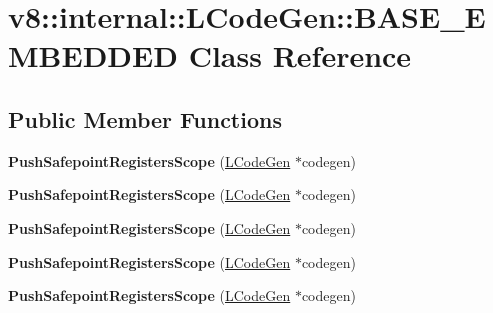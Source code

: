 \hypertarget{classv8_1_1internal_1_1_l_code_gen_1_1_b_a_s_e___e_m_b_e_d_d_e_d}{}\section{v8\+:\+:internal\+:\+:L\+Code\+Gen\+:\+:B\+A\+S\+E\+\_\+\+E\+M\+B\+E\+D\+D\+ED Class Reference}
\label{classv8_1_1internal_1_1_l_code_gen_1_1_b_a_s_e___e_m_b_e_d_d_e_d}
\subsection*{Public Member Functions}
\begin{DoxyCompactItemize}
\item 
{\bfseries Push\+Safepoint\+Registers\+Scope} (\hyperlink{classv8_1_1internal_1_1_l_code_gen}{L\+Code\+Gen} $\ast$codegen)\hypertarget{classv8_1_1internal_1_1_l_code_gen_1_1_b_a_s_e___e_m_b_e_d_d_e_d_a6f1c40f7e330b9eccecbd2c2fe37ddb1}{}\label{classv8_1_1internal_1_1_l_code_gen_1_1_b_a_s_e___e_m_b_e_d_d_e_d_a6f1c40f7e330b9eccecbd2c2fe37ddb1}

\item 
{\bfseries Push\+Safepoint\+Registers\+Scope} (\hyperlink{classv8_1_1internal_1_1_l_code_gen}{L\+Code\+Gen} $\ast$codegen)\hypertarget{classv8_1_1internal_1_1_l_code_gen_1_1_b_a_s_e___e_m_b_e_d_d_e_d_a6f1c40f7e330b9eccecbd2c2fe37ddb1}{}\label{classv8_1_1internal_1_1_l_code_gen_1_1_b_a_s_e___e_m_b_e_d_d_e_d_a6f1c40f7e330b9eccecbd2c2fe37ddb1}

\item 
{\bfseries Push\+Safepoint\+Registers\+Scope} (\hyperlink{classv8_1_1internal_1_1_l_code_gen}{L\+Code\+Gen} $\ast$codegen)\hypertarget{classv8_1_1internal_1_1_l_code_gen_1_1_b_a_s_e___e_m_b_e_d_d_e_d_a6f1c40f7e330b9eccecbd2c2fe37ddb1}{}\label{classv8_1_1internal_1_1_l_code_gen_1_1_b_a_s_e___e_m_b_e_d_d_e_d_a6f1c40f7e330b9eccecbd2c2fe37ddb1}

\item 
{\bfseries Push\+Safepoint\+Registers\+Scope} (\hyperlink{classv8_1_1internal_1_1_l_code_gen}{L\+Code\+Gen} $\ast$codegen)\hypertarget{classv8_1_1internal_1_1_l_code_gen_1_1_b_a_s_e___e_m_b_e_d_d_e_d_a6f1c40f7e330b9eccecbd2c2fe37ddb1}{}\label{classv8_1_1internal_1_1_l_code_gen_1_1_b_a_s_e___e_m_b_e_d_d_e_d_a6f1c40f7e330b9eccecbd2c2fe37ddb1}

\item 
{\bfseries Push\+Safepoint\+Registers\+Scope} (\hyperlink{classv8_1_1internal_1_1_l_code_gen}{L\+Code\+Gen} $\ast$codegen)\hypertarget{classv8_1_1internal_1_1_l_code_gen_1_1_b_a_s_e___e_m_b_e_d_d_e_d_a6f1c40f7e330b9eccecbd2c2fe37ddb1}{}\label{classv8_1_1internal_1_1_l_code_gen_1_1_b_a_s_e___e_m_b_e_d_d_e_d_a6f1c40f7e330b9eccecbd2c2fe37ddb1}


\end{DoxyCompactItemize}
